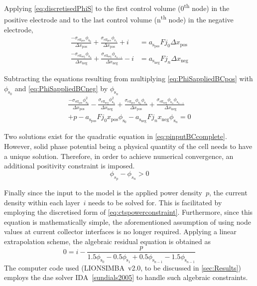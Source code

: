 Applying    \cref{eq:discretisedPhiS}    to    the    first    control    volume
(0\textsuperscript{th} node) in  the positive electrode and to  the last control
volume (n\textsuperscript{th} node) in the negative electrode,
\begin{align}
	\frac{-\sigma_{\text{eff}_\text{pos}} \phi_{\text{s}_0}}{\Delta x_\text{pos}} + \frac{\sigma_{\text{eff}_\text{pos}} \phi_{\text{s}_1}}{\Delta x_\text{pos}} + i &= a_{\text{s}_\text{pos}} F j_0 \Delta x_\text{pos}\label{eq:PhiSappliedBCpos}\\
	\frac{-\sigma_{\text{eff}_\text{neg}} \phi_{\text{s}_n}}{\Delta x_\text{neg}} + \frac{\sigma_{\text{eff}_\text{neg}} \phi_{\text{s}_{n-1}}}{\Delta x_\text{neg}} - i &= a_{\text{s}_\text{neg}} F j_n \Delta x_\text{neg}\label{eq:PhiSappliedBCneg}
\end{align}

Subtracting the equations  resulting from multiplying \cref{eq:PhiSappliedBCpos}
with $\phi_{\text{s}_0}$ and \cref{eq:PhiSappliedBCneg} by $\phi_{\text{s}_n}$
\begin{multline} \label{eq:pinputBCcomplete}
    \frac{-\sigma_{\text{eff}_\text{pos}} \phi^2_{\text{s}_0}}{\Delta x_\text{pos}} -
    \frac{\sigma_{\text{eff}_\text{neg}} \phi^2_{\text{s}_n}}{\Delta x_\text{neg}} +
    \frac{\sigma_{\text{eff}_\text{pos}} \phi_{\text{s}_0} \phi_{\text{s}_1}}{\Delta x_\text{pos}} +
    \frac{\sigma_{\text{eff}_\text{neg}} \phi_{\text{s}_n} \phi_{\text{s}_{n-1}}}{\Delta x_\text{neg}} \\+ p -
    a_{\text{s}_\text{pos}} F j_0 x_\text{pos} \phi_{\text{s}_0} - a_{\text{s}_\text{neg}} F j_n x_\text{neg}
    \phi_{\text{s}_n} = 0
\end{multline}


Two solutions  exist for  the quadratic equation  in \cref{eq:pinputBCcomplete}.
However, solid  phase potential being a  physical quantity of the  cell needs to
have a unique solution. Therefore, in order to achieve numerical convergence, an
additional positivity constraint is imposed.
\begin{equation}\label{eq:discpositivity}
	\phi_{s_p} - \phi_{s_n} > 0
\end{equation}

Finally  since the  input to  the model  is the  applied power  density~$p$, the
current  density  within  each  layer~$i$  needs  to  be  solved  for.  This  is
facilitated by  employing the discretised form  of \cref{eq:ctspowerconstraint}.
Furthermore, since  this equation  is mathematically simple,  the aforementioned
assumption of  using node values  at current  collector interfaces is  no longer
required.  Applying  a  linear  extrapolation  scheme,  the  algebraic  residual
equation is obtained as
\begin{equation}\label{eq:currdensityresidual}
    0 = i - \frac{p}{1.5 \phi_{\mathrm{s}_0} - 0.5 \phi_{\mathrm{s}_1} + 0.5 \phi_{\mathrm{s}_{n-1}} - 1.5 \phi_{\mathrm{s}_{n-1}}}
\end{equation}
The computer code  used (LIONSIMBA~v2.0, to be  discussed in \cref{sec:Results})
employs the  \gls{dae} solver  IDA~\cref{sundials2005} to handle  such algebraic
constraints.

